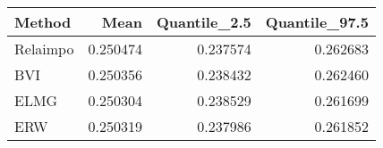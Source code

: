 \begin{table}[ht]
\centering
\begin{tabular}{lrrr}
  \hline
Method & Mean & Quantile\_2.5 & Quantile\_97.5 \\ 
  \hline
Relaimpo & 0.250474 & 0.237574 & 0.262683 \\ 
  BVI & 0.250356 & 0.238432 & 0.262460 \\ 
  ELMG & 0.250304 & 0.238529 & 0.261699 \\ 
  ERW & 0.250319 & 0.237986 & 0.261852 \\ 
   \hline
\end{tabular}
\end{table}
